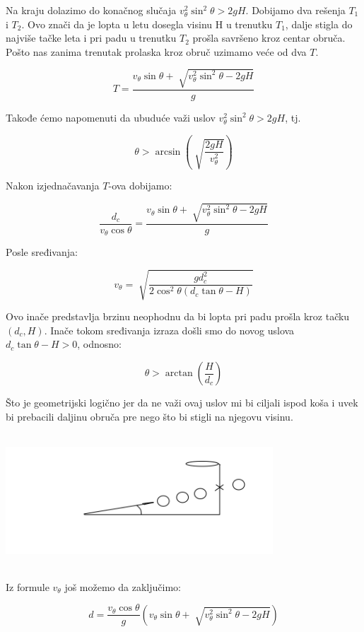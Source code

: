 \documentclass[a4paper, 12pt]{article}
\begin{document}
Na kraju dolazimo do konačnog slučaja ${v_{\theta}^2 \sin^2 \theta > 2 g H}$. Dobijamo dva rešenja $T_1$ i $T_2$. Ovo znači da je lopta u letu dosegla visinu H u trenutku $T_1$, dalje stigla do najviše tačke leta i pri padu u trenutku $T_2$ prošla savršeno kroz centar obruča. Pošto nas zanima trenutak prolaska kroz obruč uzimamo veće od dva $T$.

\[T = \dfrac{v_{\theta} \sin \theta + \sqrt[]{v_{\theta}^2 \sin^2 \theta - 2 g H}}{g}\]

Takođe ćemo napomenuti da ubuduće važi uslov ${v_{\theta}^2 \sin^2 \theta > 2 g H}$, tj.

\[{\theta} > \arcsin(\sqrt[]{\dfrac{2 g H}{v_{\theta}^2}}) \]

\pagebreak

Nakon izjednačavanja $T$-ova dobijamo:

\[\dfrac{d_c}{v_\theta \cos \theta} = \dfrac{v_{\theta} \sin \theta + \sqrt[]{v_{\theta}^2 \sin^2 \theta - 2 g H}}{g}\]

Posle sređivanja: %

\[v_\theta = \sqrt[]{\dfrac{g d_c^2}{2 \cos^2 \theta (d_c \tan \theta - H)}}\]

Ovo inače predstavlja brzinu neophodnu da bi lopta pri padu prošla kroz tačku $(d_c,H)$.
Inače tokom sređivanja izraza došli smo do novog uslova $d_c \tan \theta - H > 0$, odnosno:

\[{\theta} > \arctan(\dfrac{H}{d_c}) \]

Što je geometrijski logično jer da ne važi ovaj uslov mi bi ciljali ispod koša i uvek bi prebacili daljinu obruča pre nego što bi stigli na njegovu visinu.

\includegraphics[width=10cm, height=5cm]{pic3}

Iz formule $v_\theta$ još možemo da zaključimo:

\[d = \dfrac{v_\theta \cos \theta}{g}(v_{\theta} \sin \theta + \sqrt[]{v_{\theta}^2 \sin^2 \theta - 2 g H}) \]
\end{document}
